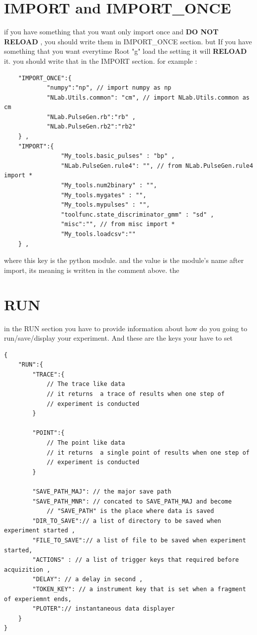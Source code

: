 \documentclass{article}
\begin{document}
\section{IMPORT and IMPORT\_ONCE }
if you have something that you want only import once and
{\bf DO NOT RELOAD} , you should write them in IMPORT\_ONCE section.
but If you have something that you want everytime Root "g" 
load the setting it will {\bf RELOAD} it. you should
write that in the IMPORT section. for example : 
\begin{lstlisting}
	"IMPORT_ONCE":{
			"numpy":"np", // import numpy as np
			"NLab.Utils.common": "cm", // import NLab.Utils.common as cm
			"NLab.PulseGen.rb":"rb" ,
			"NLab.PulseGen.rb2":"rb2"
	} ,
    "IMPORT":{
				"My_tools.basic_pulses" : "bp" ,
				"NLab.PulseGen.rule4": "", // from NLab.PulseGen.rule4 import * 
				"My_tools.num2binary" : "",
				"My_tools.mygates" : "",
				"My_tools.mypulses" : "",
				"toolfunc.state_discriminator_gmm" : "sd" ,
				"misc":"", // from misc import * 
				"My_tools.loadcsv":""
    } ,
\end{lstlisting}
where this key is the python module. and the value is the module's name after import, its meaning is written in the comment above.
the 


\section{RUN}
in the RUN section you have to provide information
about how do you going to run/save/display your experiment.
And these are the keys your have to set

\begin{lstlisting}
{
	"RUN":{
		"TRACE":{
			// The trace like data
			// it returns  a trace of results when one step of
			// experiment is conducted
		}
   
		"POINT":{
			// The point like data
			// it returns  a single point of results when one step of
			// experiment is conducted
		}

		"SAVE_PATH_MAJ": // the major save path
		"SAVE_PATH_MNR": // concated to SAVE_PATH_MAJ and become 
			// "SAVE_PATH" is the place where data is saved
		"DIR_TO_SAVE":// a list of directory to be saved when experiment started ,
		"FILE_TO_SAVE":// a list of file to be saved when experiment started,
		"ACTIONS" : // a list of trigger keys that required before acquizition ,
		"DELAY": // a delay in second ,
		"TOKEN_KEY": // a instrument key that is set when a fragment of experiemnt ends,
		"PLOTER":// instantaneous data displayer
	}
}

\end{lstlisting}
\end{document}
